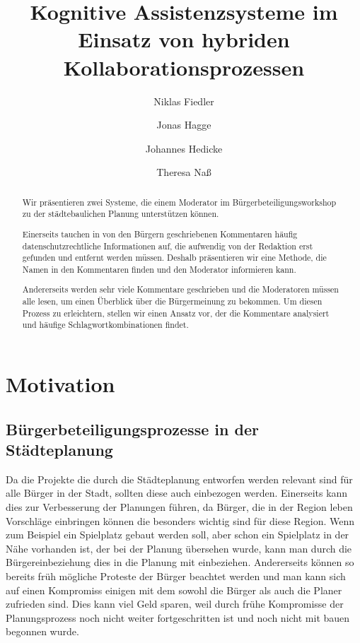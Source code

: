 \documentclass[runningheads]{llncs}
\begin{document}
%
\title{Kognitive Assistenzsysteme im Einsatz von hybriden Kollaborationsprozessen}
%
%
\author{Niklas Fiedler \and
Jonas Hagge \and
Johannes Hedicke \and
Theresa Naß }
%
%
%
\maketitle              %
%
\begin{abstract}
Wir präsentieren zwei Systeme, die einem Moderator im Bürgerbeteiligungsworkshop zu der städtebaulichen Planung unterstützen können.

Einerseits tauchen in von den Bürgern geschriebenen Kommentaren häufig datenschutzrechtliche Informationen auf, die aufwendig von der Redaktion erst gefunden und entfernt werden müssen.
Deshalb präsentieren wir eine Methode, die Namen in den Kommentaren finden und den Moderator informieren kann.

Andererseits werden sehr viele Kommentare geschrieben und die Moderatoren müssen alle lesen, um einen Überblick über die Bürgermeinung zu bekommen.
Um diesen Prozess zu erleichtern, stellen wir einen Ansatz vor, der die Kommentare analysiert und häufige Schlagwortkombinationen findet.

\end{abstract}
%
%
%
\section{Motivation}
	\subsection{Bürgerbeteiligungsprozesse in der Städteplanung}
		Da die Projekte die durch die Städteplanung entworfen werden relevant sind für alle Bürger in der Stadt, sollten diese auch einbezogen werden.
		Einerseits kann dies zur Verbesserung der Planungen führen, da Bürger, die in der Region leben Vorschläge einbringen können die besonders wichtig sind für diese Region.
		Wenn zum Beispiel ein Spielplatz gebaut werden soll, aber schon ein Spielplatz in der Nähe vorhanden ist, der bei der Planung übersehen wurde, kann man durch die Bürgereinbeziehung dies in die Planung mit einbeziehen.
		Andererseits können so bereits früh mögliche Proteste der Bürger beachtet werden und man kann sich auf einen Kompromiss einigen mit dem sowohl die Bürger als auch die Planer zufrieden sind.
		Dies kann viel Geld sparen, weil durch frühe Kompromisse der Planungsprozess noch nicht weiter fortgeschritten ist und noch nicht mit bauen begonnen wurde.
	
\end{document}
